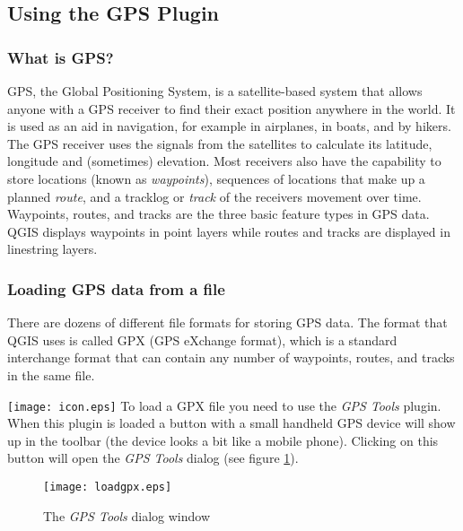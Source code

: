\subsection{Using the GPS Plugin}\label{label_plugingps}

\subsubsection{What is GPS?}\label{whatsgps}

GPS, the Global Positioning System, is a satellite-based system that
allows anyone with a GPS receiver to find their exact position anywhere
in the world. It is used as an aid in navigation, for example in airplanes,
in boats, and by hikers. The GPS receiver uses the signals from the
satellites to calculate its latitude, longitude and (sometimes) elevation.
Most receivers also have the capability to store locations (known
as \emph{waypoints}), sequences of locations that make up a planned
\emph{route}, and a tracklog or \emph{track} of the receivers movement
over time. Waypoints, routes, and tracks are the three basic feature
types in GPS data. QGIS displays waypoints in point layers while routes
and tracks are displayed in linestring layers.

\subsubsection{Loading GPS data from a file}\label{label_loadgps}

There are dozens of different file formats for storing GPS data. The
format that QGIS uses is called GPX (GPS eXchange format), which is
a standard interchange format that can contain any number of waypoints,
routes, and tracks in the same file.

\texttt{[image: icon.eps]} To load a GPX file you need to use the
\emph{GPS
Tools} plugin. When this plugin is loaded a button with a small handheld GPS
device will show up in the toolbar (the device looks a bit like a mobile
phone). Clicking on this button will open the \emph{GPS Tools} dialog (see
figure \ref{figure GPX loader}).

\begin{figure}[ht]
   \begin{center}
\caption{\label{figure GPX loader}The \emph{GPS Tools} dialog window}
\texttt{[image: loadgpx.eps]}
\end{center}
\end{figure}

